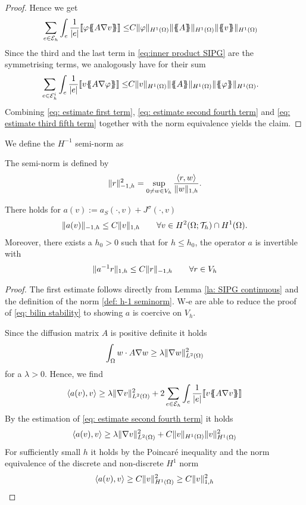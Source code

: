 \begin{proof}
Hence we get
\begin{align}
\sum\limits_{e \in \edges}\int_{e} \frac 1 {|e|}\jump {\varphi \average{A \nabla v} } \leq&
	C \HOnenorm{ \varphi}\HOnenorm{\average A}\HOnenorm{\average{v}}\label{eq: estimate second fourth term}
\end{align}
Since the third and the last term in \eqref{eq:inner product SIPG} are the symmetrising terms, we analogously have for their sum
\begin{align}
\sum\limits_{e \in \edgesi}\int_{e} \frac 1 {|e|}\jump {v \average{A \nabla \varphi} } \leq&
C \HOnenorm{v}\HOnenorm{\average A}\HOnenorm{\average{\varphi}}. \label{eq: estimate third fifth term}
\end{align}
Combining \eqref{eq: estimate first term}, \eqref{eq: estimate second fourth term} and \eqref{eq: estimate third fifth term} together with the norm equivalence yields the claim.
\end{proof}

We define the $H^{-1}$ semi-norm as 
\begin{definition} \label{def: h-1 seminorm}
	The semi-norm is defined by 
	\[
		\lVert r \rVert_{-1,h} ^2 = \sup_{0 \neq w \in V_h} \frac {{ \langle r, w \rangle } } {\lVert w \rVert_{1,h}}.
	\]
\end{definition}

\begin{theorem}[Stability]
There holds for $a (v):=a_S(\cdot, v)+J^\sigma(\cdot, v)$
	\begin{align}
	 	\lVert a (v) \rVert_{-1,h} \leq C \lVert v \rVert_{1,h} \qquad \forall v \in H^2(\Omega; \mathcal{T}_h) \cap H^1(\Omega). \label{eq: bilin continuity}
	 \end{align}
	 Moreover, there exists a $h_0 > 0$ such that for $h \leq h_0 $, the operator $a$ is invertible with 
	 \begin{align}
	 	\lVert a^{-1} r \rVert_{1,h} \leq C \lVert r \rVert_{-1,h} \qquad \forall r \in V_h \label{eq: bilin stability}
	 \end{align}
\end{theorem}
\begin{proof}
	The first estimate follows directly from Lemma \ref{la: SIPG continuous} and the definition of the norm \ref{def: h-1 seminorm}. W-e are able to reduce the proof of \eqref{eq: bilin stability} to showing $a$ is coercive on $V_h$.
	
	Since the diffusion matrix $A$ is positive definite it holds
	\[
		\int_\Omega  w \cdot A \nabla w \geq \lambda \lVert \nabla w  \rVert_{L^2(\Omega)}^2 
	\]
	for a $\lambda >0$.
	Hence, we find
	\[
		 \langle a(v), v \rangle  \geq \lambda \lVert \nabla v  \rVert_{L^2(\Omega)}^2 + 2 \sum\limits_{e \in \mathcal{E}_h}\int_{e} \frac 1 {|e|}\llbracket v \{\!\!\{ A \nabla v \}\!\!\}  \rrbracket
	\] 
	By the estimation of \eqref{eq: estimate second fourth term} it holds 
		\[
			 \langle a(v), v \rangle  \geq \lambda \lVert \nabla v  \rVert_{L^2(\Omega)}^2 + C \lVert v \rVert_{H^1(\Omega)} \lVert v \rVert_{H^1(\Omega)}^2
		\] 
	For sufficiently small $h$ it holds by the Poincar\'e inequality and the norm equivalence of the discrete and non-discrete $H^1$ norm
	\[
		 \langle a(v), v \rangle  \geq C  \lVert v \rVert_{H^1(\Omega)}^2 \geq C  \lVert v \rVert_{1,h}^2
	\]
\end{proof}

